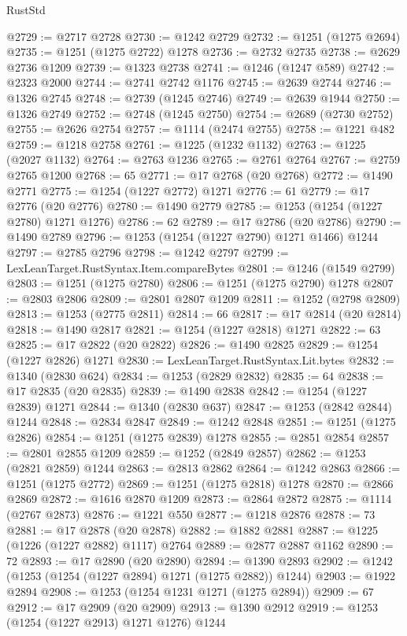\begin{lexlean}{RustStd}
\begin{coremodule}
@2729 := @2717 @2728
@2730 := @1242 @2729
@2732 := @1251 (@1275 @2694)
@2735 := @1251 (@1275 @2722) @1278
@2736 := @2732 @2735
@2738 := @2629 @2736 @1209
@2739 := @1323 @2738
@2741 := @1246 (@1247 @589)
@2742 := @2323 @2000
@2744 := @2741 @2742 @1176
@2745 := @2639 @2744
@2746 := @1326 @2745
@2748 := @2739 (@1245 @2746)
@2749 := @2639 @1944
@2750 := @1326 @2749
@2752 := @2748 (@1245 @2750)
@2754 := @2689 (@2730 @2752)
@2755 := @2626 @2754
@2757 := @1114 (@2474 @2755)
@2758 := @1221 @482
@2759 := @1218 @2758
@2761 := @1225 (@1232 @1132)
@2763 := @1225 (@2027 @1132)
@2764 := @2763 @1236
@2765 := @2761 @2764
@2767 := @2759 @2765 @1200
@2768 := 65
@2771 := @17 @2768 (@20 @2768)
@2772 := @1490 @2771
@2775 := @1254 (@1227 @2772) @1271
@2776 := 61
@2779 := @17 @2776 (@20 @2776)
@2780 := @1490 @2779
@2785 := @1253 (@1254 (@1227 @2780) @1271 @1276)
@2786 := 62
@2789 := @17 @2786 (@20 @2786)
@2790 := @1490 @2789
@2796 := @1253 (@1254 (@1227 @2790) @1271 @1466) @1244
@2797 := @2785 @2796
@2798 := @1242 @2797
@2799 := LexLeanTarget.RustSyntax.Item.compareBytes
@2801 := @1246 (@1549 @2799)
@2803 := @1251 (@1275 @2780)
@2806 := @1251 (@1275 @2790) @1278
@2807 := @2803 @2806
@2809 := @2801 @2807 @1209
@2811 := @1252 (@2798 @2809)
@2813 := @1253 (@2775 @2811)
@2814 := 66
@2817 := @17 @2814 (@20 @2814)
@2818 := @1490 @2817
@2821 := @1254 (@1227 @2818) @1271
@2822 := 63
@2825 := @17 @2822 (@20 @2822)
@2826 := @1490 @2825
@2829 := @1254 (@1227 @2826) @1271
@2830 := LexLeanTarget.RustSyntax.Lit.bytes
@2832 := @1340 (@2830 @624)
@2834 := @1253 (@2829 @2832)
@2835 := 64
@2838 := @17 @2835 (@20 @2835)
@2839 := @1490 @2838
@2842 := @1254 (@1227 @2839) @1271
@2844 := @1340 (@2830 @637)
@2847 := @1253 (@2842 @2844) @1244
@2848 := @2834 @2847
@2849 := @1242 @2848
@2851 := @1251 (@1275 @2826)
@2854 := @1251 (@1275 @2839) @1278
@2855 := @2851 @2854
@2857 := @2801 @2855 @1209
@2859 := @1252 (@2849 @2857)
@2862 := @1253 (@2821 @2859) @1244
@2863 := @2813 @2862
@2864 := @1242 @2863
@2866 := @1251 (@1275 @2772)
@2869 := @1251 (@1275 @2818) @1278
@2870 := @2866 @2869
@2872 := @1616 @2870 @1209
@2873 := @2864 @2872
@2875 := @1114 (@2767 @2873)
@2876 := @1221 @550
@2877 := @1218 @2876
@2878 := 73
@2881 := @17 @2878 (@20 @2878)
@2882 := @1882 @2881
@2887 := @1225 (@1226 (@1227 @2882) @1117) @2764
@2889 := @2877 @2887 @1162
@2890 := 72
@2893 := @17 @2890 (@20 @2890)
@2894 := @1390 @2893
@2902 := @1242 (@1253 (@1254 (@1227 @2894) @1271 (@1275 @2882)) @1244)
@2903 := @1922 @2894
@2908 := @1253 (@1254 @1231 @1271 (@1275 @2894))
@2909 := 67
@2912 := @17 @2909 (@20 @2909)
@2913 := @1390 @2912
@2919 := @1253 (@1254 (@1227 @2913) @1271 @1276) @1244

\end{coremodule}
\end{lexlean}
